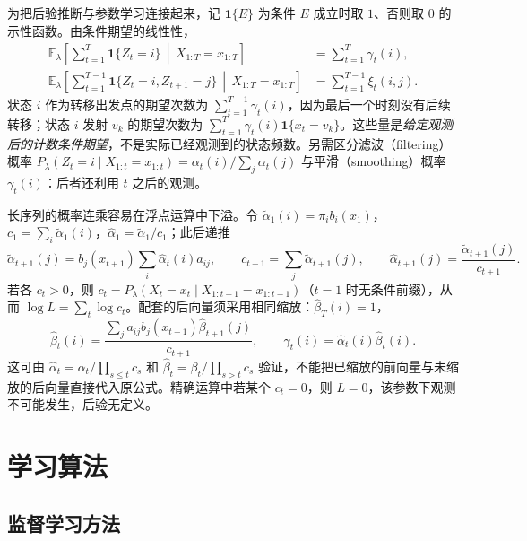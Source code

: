 为把后验推断与参数学习连接起来，记 $\mathbf1\{E\}$ 为条件 $E$ 成立时取 $1$、否则取 $0$ 的示性函数。由条件期望的线性性，
\begin{align}
\label{eq:lh-hmm-counts}
 \mathbb E_\lambda\!\left[\sum_{t=1}^T\mathbf1\{Z_t=i\}\,\middle|\,X_{1:T}=x_{1:T}\right]
 &=\sum_{t=1}^T\gamma_t(i),\\
\label{eq:lh-hmm-transition-counts}
 \mathbb E_\lambda\!\left[\sum_{t=1}^{T-1}\mathbf1\{Z_t=i,Z_{t+1}=j\}\,\middle|\,X_{1:T}=x_{1:T}\right]
 &=\sum_{t=1}^{T-1}\xi_t(i,j).
\end{align}
状态 $i$ 作为转移出发点的期望次数为 $\sum_{t=1}^{T-1}\gamma_t(i)$，因为最后一个时刻没有后续转移；状态 $i$ 发射 $v_k$ 的期望次数为 $\sum_{t=1}^T\gamma_t(i)\mathbf1\{x_t=v_k\}$。这些量是\emph{给定观测后的计数条件期望}，不是实际已经观测到的状态频数。另需区分滤波（filtering）概率 $P_\lambda(Z_t=i\mid X_{1:t}=x_{1:t})=\alpha_t(i)/\sum_j\alpha_t(j)$ 与平滑（smoothing）概率 $\gamma_t(i)$：后者还利用 $t$ 之后的观测。

\begin{notealert}[type=tip,title={长序列的缩放计算}]
长序列的概率连乘容易在浮点运算中下溢。令 $\widetilde\alpha_1(i)=\pi_i b_i(x_1)$，$c_1=\sum_i\widetilde\alpha_1(i)$，$\widehat\alpha_1=\widetilde\alpha_1/c_1$；此后递推
\[
 \widetilde\alpha_{t+1}(j)=b_j(x_{t+1})\sum_i\widehat\alpha_t(i)a_{ij},\qquad
 c_{t+1}=\sum_j\widetilde\alpha_{t+1}(j),\qquad
 \widehat\alpha_{t+1}(j)=\frac{\widetilde\alpha_{t+1}(j)}{c_{t+1}}.
\]
若各 $c_t>0$，则 $c_t=P_\lambda(X_t=x_t\mid X_{1:t-1}=x_{1:t-1})$（$t=1$ 时无条件前缀），从而 $\log L=\sum_t\log c_t$。配套的后向量须采用相同缩放：$\widehat\beta_T(i)=1$，
\[
 \widehat\beta_t(i)=\frac{\sum_j a_{ij}b_j(x_{t+1})\widehat\beta_{t+1}(j)}{c_{t+1}},\qquad
 \gamma_t(i)=\widehat\alpha_t(i)\widehat\beta_t(i).
\]
这可由 $\widehat\alpha_t=\alpha_t/\prod_{s\leq t}c_s$ 和 $\widehat\beta_t=\beta_t/\prod_{s>t}c_s$ 验证，不能把已缩放的前向量与未缩放的后向量直接代入原公式。精确运算中若某个 $c_t=0$，则 $L=0$，该参数下观测不可能发生，后验无定义。
\end{notealert}

\section{学习算法}
\label{sec:lh-hmm-learning}

\subsection{监督学习方法}

